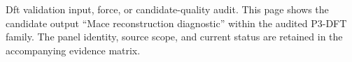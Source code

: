 Dft validation input, force, or candidate-quality audit. This page shows the candidate output ``Mace reconstruction diagnostic'' within the audited P3-DFT family. The panel identity, source scope, and current status are retained in the accompanying evidence matrix.
